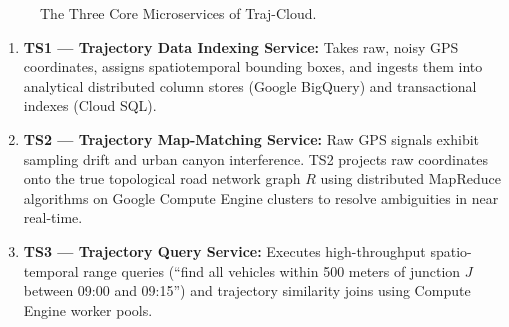 \begin{figure}[H]
\centering
{}
\caption{The Three Core Microservices of Traj-Cloud.}
\end{figure}

\begin{enumerate}[leftmargin=*]
  \item \textbf{TS1 --- Trajectory Data Indexing Service:} Takes raw, noisy GPS coordinates, assigns spatiotemporal bounding boxes, and ingests them into analytical distributed column stores (Google BigQuery) and transactional indexes (Cloud SQL).
  \item \textbf{TS2 --- Trajectory Map-Matching Service:} Raw GPS signals exhibit sampling drift and urban canyon interference. TS2 projects raw coordinates onto the true topological road network graph $R$ using distributed MapReduce algorithms on Google Compute Engine clusters to resolve ambiguities in near real-time.
  \item \textbf{TS3 --- Trajectory Query Service:} Executes high-throughput spatio-temporal range queries (``find all vehicles within 500 meters of junction $J$ between 09:00 and 09:15'') and trajectory similarity joins using Compute Engine worker pools.
\end{enumerate}

